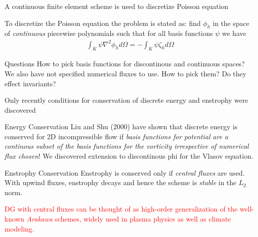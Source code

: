 \documentclass[pdf]{beamer}
\newcommand{\mypause}{}
\theoremstyle{definition}
\begin{document}
\begin{frame}{A continuous finite element scheme is used to discretize
    Poisson equation}

  To discretize the Poisson equation the problem is stated as: find
  $\phi_h$ in the space of \emph{continuous} piecewise polynomials
  such that for all basis functions $\psi$ we have
  \begin{align*}
    \int_K \psi \nabla^2 \phi_h d\Omega = -\int_K \psi \zeta_h d\Omega
  \end{align*}
  \mypause
  \begin{block}{Questions}
    How to pick basis functions for discontinous and continuous
    spaces? We also have not specified numerical fluxes to use. How to
    pick them?  Do they effect invariants?
  \end{block}
\end{frame}

\begin{frame}{Only recently conditions for conservation of discrete
    energy and enstrophy were discovered}%
  \small
  \begin{block}{Energy Conservation}
    Liu and Shu (2000) have shown that discrete energy is conserved
    for 2D incompressible flow if \emph{basis functions for potential
      are a continous subset of the basis functions for the vorticity
      irrespective of numerical flux chosen}! We discovered extension
    to discontinous phi for the Vlasov equation.
  \end{block}

  \begin{block}{Enstrophy Conservation}
    Enstrophy is conserved only if \emph{central fluxes} are
    used. With upwind fluxes, enstrophy decays and hence the scheme is
    \emph{stable} in the $L_2$ norm.
  \end{block}

  \mypause \textcolor{red}{DG with central fluxes can be thought of as
    high-order generalization of the well-known \emph{Arakawa}
    schemes, widely used in plasma physics as well as climate
    modeling.}

\end{frame}
\end{document}
